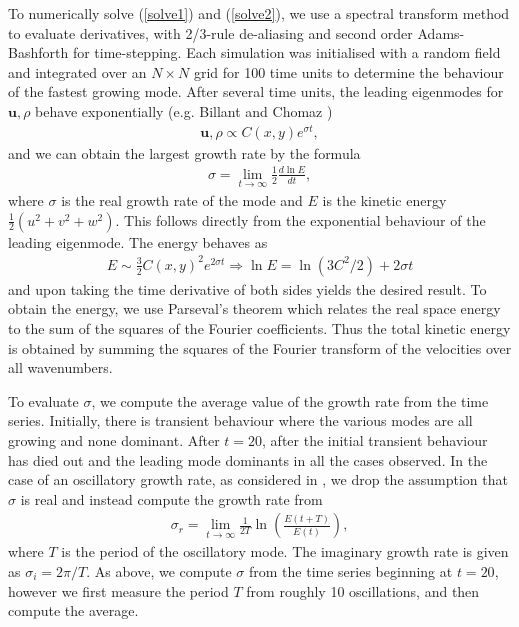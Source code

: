 To numerically solve (\ref{solve1}) and (\ref{solve2}), we use a spectral transform method to evaluate derivatives, with 2/3-rule de-aliasing and second order Adams-Bashforth for time-stepping. Each simulation was initialised with a random field and integrated over an $N\times N$ grid for 100 time units to determine the behaviour of the fastest growing mode. After several time units, the leading eigenmodes for $\bm{u},\rho$ behave exponentially (e.g. Billant and Chomaz \cite{bc2000c})
\begin{align}
\bm{u},\rho \propto C(x,y)e^{\sigma t},
\end{align}
and we can obtain the largest growth rate by the formula
\begin{align}
\sigma = \lim_{t\rightarrow\infty}\frac{1}{2}\frac{d\ln E}{dt}\label{sigma1},
\end{align}
where $\sigma$ is the real growth rate of the mode and $E$ is the kinetic energy $\frac{1}{2}(u^{2}+v^{2}+w^{2})$. This follows directly from the exponential behaviour of the leading eigenmode. The energy behaves as
\begin{align}
E \sim \frac{3}{2}C(x,y)^{2}e^{2\sigma t} \Rightarrow \ln E = \ln(3C^{2}/2) + 2\sigma t
\end{align}
and upon taking the time derivative of both sides yields the desired result. To obtain the energy, we use Parseval's theorem which relates the real space energy to the sum of the squares of the Fourier coefficients. Thus the total kinetic energy is obtained by summing the squares of the Fourier transform of the velocities over all wavenumbers. 

To evaluate $\sigma$, we compute the average value of the growth rate from the time series. Initially, there is transient behaviour where the various modes are all growing and none dominant. After $t=20$, after the initial transient behaviour has died out and the leading mode dominants in all the cases observed. In the case of an oscillatory growth rate, as considered in \cite{bc1999}, we drop the assumption that $\sigma$ is real and instead compute the growth rate from
\begin{align}
\sigma_{r} = \lim_{t\rightarrow \infty} \frac{1}{2T}\ln\left(\frac{E(t+T)}{E(t)}\right)\label{sigma2},
\end{align}
where $T$ is the period of the oscillatory mode. The imaginary growth rate is given as $\sigma_{i}=2\pi/T$. As above, we compute $\sigma$ from the time series beginning at $t=20$, however we first measure the period $T$ from roughly 10 oscillations, and then compute the average.  

